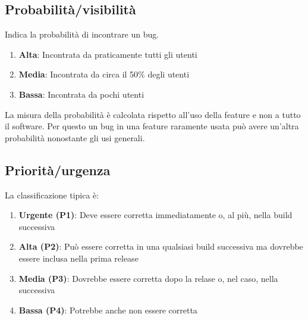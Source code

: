 \documentclass[11pt,a4paper]{book}
\begin{document}
\subsection{Probabilità/visibilità} \label{par: Defect probabilty}
Indica la probabilità di incontrare un bug.
\begin{enumerate}
	\item \textbf{Alta}: Incontrata da praticamente tutti gli utenti
	\item \textbf{Media}: Incontrata da circa il 50\% degli utenti
	\item \textbf{Bassa}: Incontrata da pochi utenti
\end{enumerate}

La misura della probabilità è calcolata rispetto all'uso della feature e non a tutto il software. Per questo un bug in una feature raramente usata può avere un'altra probabilità nonostante gli usi generali.

\subsection{Priorità/urgenza} \label{par: Defect priority}
La classificazione tipica è:
\begin{enumerate}
	\item \textbf{Urgente (P1)}: Deve essere corretta immediatamente o, al più, nella build successiva
	\item \textbf{Alta (P2)}: Può essere corretta in una qualsiasi build successiva ma dovrebbe essere inclusa nella prima release
	\item \textbf{Media (P3)}: Dovrebbe essere corretta dopo la relase o, nel caso, nella successiva	
	\item \textbf{Bassa (P4)}: Potrebbe anche non essere corretta
\end{enumerate}
\end{document}
